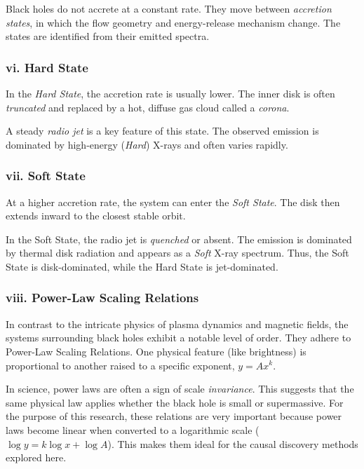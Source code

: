 Black holes do not accrete at a constant rate. They move between \textit{accretion states}, in which the flow geometry and energy-release mechanism change. The states are identified from their emitted spectra.

\subsubsection*{vi. Hard State}

In the \textit{Hard State}, the accretion rate is usually lower. The inner disk is often \textit{truncated} and replaced by a hot, diffuse gas cloud called a \textit{corona}.

A steady \textit{radio jet} is a key feature of this state. The observed emission is dominated by high-energy (\textit{Hard}) X-rays and often varies rapidly.

\subsubsection*{vii. Soft State}

At a higher accretion rate, the system can enter the \textit{Soft State}. The disk then extends inward to the closest stable orbit.

In the Soft State, the radio jet is \textit{quenched} or absent. The emission is dominated by thermal disk radiation and appears as a \textit{Soft} X-ray spectrum. Thus, the Soft State is disk-dominated, while the Hard State is jet-dominated.

\subsubsection*{viii. Power-Law Scaling Relations}

In contrast to the intricate physics of plasma dynamics and magnetic fields, the systems surrounding black holes exhibit a notable level of order. They adhere to Power-Law Scaling Relations. One physical feature (like brightness) is proportional to another raised to a specific exponent, $y = A x^k$.

In science, power laws are often a sign of scale \textit{invariance}. This suggests that the same physical law applies whether the black hole is small or supermassive. For the purpose of this research, these relations are very important because power laws become linear when converted to a logarithmic scale ($\log y = k \log x + \log A$). This makes them ideal for the causal discovery methods explored here.

